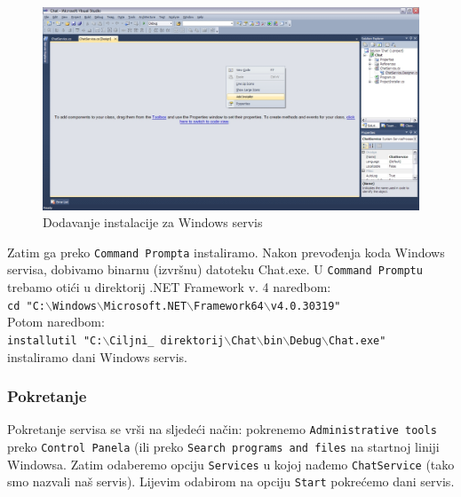 \documentclass[10pt,a4paper,onecolumn,titlepage]{article}
\begin{document}
\begin{figure}[!ht]
\begin{minipage}{\textwidth}
\centering
\includegraphics[width=\textwidth]{images/add_installer.jpg}
\caption{Dodavanje instalacije za Windows servis}
\end{minipage}
\end{figure}

Zatim ga preko \texttt{Command Prompta} instaliramo. Nakon prevođenja koda Windows servisa, dobivamo binarnu (izvršnu) datoteku Chat.exe. U \texttt{Command Promptu} trebamo otići u direktorij .NET Framework v. 4 naredbom:\\
\texttt{cd "C:$\backslash$Windows$\backslash$Microsoft.NET$\backslash$Framework64$\backslash$v4.0.30319"}\\
Potom naredbom:\\
\texttt{installutil "C:$\backslash$Ciljni\_ direktorij$\backslash$Chat$\backslash$bin$\backslash$Debug$\backslash$Chat.exe"}\\
instaliramo dani Windows servis.

\subsubsection{Pokretanje}
Pokretanje servisa se vrši na sljedeći način: pokrenemo \texttt{Administrative tools}
preko \texttt{Control Panela} (ili preko \texttt{Search programs and files} na startnoj liniji Windowsa. Zatim odaberemo opciju \texttt{Services} u kojoj nađemo \texttt{ChatService}
(tako smo nazvali naš servis). Lijevim odabirom na opciju \texttt{Start} pokrećemo
dani servis.
\end{document}
